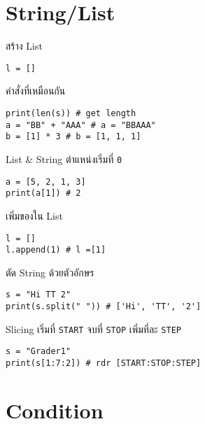 \documentclass[11pt,a4paper,twocolumn]{article}
\begin{document}
\vspace{-2ex}
\section*{String/List}
\vspace{-1ex}

สร้าง List
\vspace{-2.5ex}
\begin{verbatim}
l = []
\end{verbatim}
\vspace{-1ex}

คำสั่งที่เหมือนกัน
\vspace{-2.5ex}
\begin{verbatim}
print(len(s)) # get length
a = "BB" + "AAA" # a = "BBAAA"
b = [1] * 3 # b = [1, 1, 1]
\end{verbatim}
\vspace{-1ex}

List \& String ตำแหน่งเริ่มที่ \verb|0|
\vspace{-2.5ex}
\begin{verbatim}
a = [5, 2, 1, 3]
print(a[1]) # 2
\end{verbatim}
\vspace{-1ex}

เพิ่มของใน List
\vspace{-2.5ex}
\begin{verbatim}
l = []
l.append(1) # l =[1]
\end{verbatim}
\vspace{-1ex}

ตัด String ด้วยตัวอักษร
\vspace{-2.5ex}
\begin{verbatim}
s = "Hi TT 2"
print(s.split(" ")) # ['Hi', 'TT', '2']
\end{verbatim}
\vspace{-1ex}

Slicing เริ่มที่ \verb|START| จบที่ \verb|STOP| เพิ่มที่ละ \verb|STEP|
\vspace{-2.5ex}
\begin{verbatim}
s = "Grader1"
print(s[1:7:2]) # rdr [START:STOP:STEP]
\end{verbatim}
\vspace{-1ex}

\vspace{-2ex}
\section*{Condition}
\vspace{-1ex}
\end{document}
